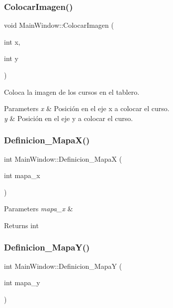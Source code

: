 \subsubsection{\texorpdfstring{Colocar\+Imagen()}{ColocarImagen()}}
{\footnotesize\ttfamily void Main\+Window\+::\+Colocar\+Imagen (\begin{DoxyParamCaption}\item[{int}]{x,  }\item[{int}]{y }\end{DoxyParamCaption})}



Coloca la imagen de los cursos en el tablero. 


\begin{DoxyParams}{Parameters}
{\em x} & Posición en el eje x a colocar el curso. \\
\hline
{\em y} & Posición en el eje y a colocar el curso. \\
\hline
\end{DoxyParams}
\mbox{\label{classMainWindow_aa06021cdca887a633eace0bf8761b3e7}} 
\subsubsection{\texorpdfstring{Definicion\+\_\+\+Mapa\+X()}{Definicion\_MapaX()}}
{\footnotesize\ttfamily int Main\+Window\+::\+Definicion\+\_\+\+MapaX (\begin{DoxyParamCaption}\item[{int}]{mapa\+\_\+x }\end{DoxyParamCaption})}


\begin{DoxyParams}{Parameters}
{\em mapa\+\_\+x} & \\
\hline
\end{DoxyParams}
\begin{DoxyReturn}{Returns}
int 
\end{DoxyReturn}
\mbox{\label{classMainWindow_a4b1f37b214d278525abbae10445e64a9}} 
\subsubsection{\texorpdfstring{Definicion\+\_\+\+Mapa\+Y()}{Definicion\_MapaY()}}
{\footnotesize\ttfamily int Main\+Window\+::\+Definicion\+\_\+\+MapaY (\begin{DoxyParamCaption}\item[{int}]{mapa\+\_\+y }\end{DoxyParamCaption})}


